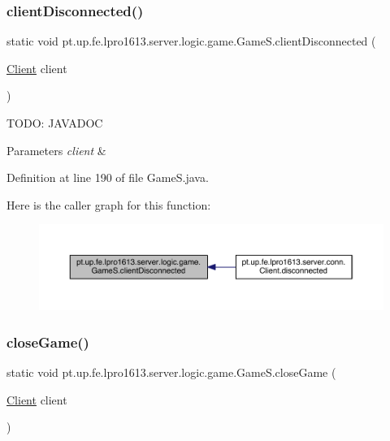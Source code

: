 \subsubsection{\texorpdfstring{client\+Disconnected()}{clientDisconnected()}}
{\footnotesize\ttfamily static void pt.\+up.\+fe.\+lpro1613.\+server.\+logic.\+game.\+Game\+S.\+client\+Disconnected (\begin{DoxyParamCaption}\item[{\hyperlink{classpt_1_1up_1_1fe_1_1lpro1613_1_1server_1_1conn_1_1_client}{Client}}]{client }\end{DoxyParamCaption})\hspace{0.3cm}{\ttfamily [static]}}

T\+O\+DO\+: J\+A\+V\+A\+D\+OC 
\begin{DoxyParams}{Parameters}
{\em client} & \\
\hline
\end{DoxyParams}


Definition at line 190 of file Game\+S.\+java.

Here is the caller graph for this function\+:
\nopagebreak
\begin{figure}[H]
\begin{center}
\leavevmode
\includegraphics[width=350pt]{classpt_1_1up_1_1fe_1_1lpro1613_1_1server_1_1logic_1_1game_1_1_game_s_aed1d2b65cf8abf9429c7613fb270140c_icgraph}
\end{center}
\end{figure}
\hypertarget{classpt_1_1up_1_1fe_1_1lpro1613_1_1server_1_1logic_1_1game_1_1_game_s_ad46d38d4c8bf34645dd93cbb2d79de12}{}\label{classpt_1_1up_1_1fe_1_1lpro1613_1_1server_1_1logic_1_1game_1_1_game_s_ad46d38d4c8bf34645dd93cbb2d79de12} 
\subsubsection{\texorpdfstring{close\+Game()}{closeGame()}}
{\footnotesize\ttfamily static void pt.\+up.\+fe.\+lpro1613.\+server.\+logic.\+game.\+Game\+S.\+close\+Game (\begin{DoxyParamCaption}\item[{\hyperlink{classpt_1_1up_1_1fe_1_1lpro1613_1_1server_1_1conn_1_1_client}{Client}}]{client }\end{DoxyParamCaption})\hspace{0.3cm}{\ttfamily [static]}}

